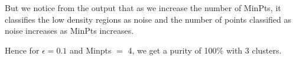 \documentclass[paper=a4, fontsize=11pt]{scrartcl}
\numberwithin{equation}{section}		%
\numberwithin{figure}{section}			%
\numberwithin{table}{section}				%
\begin{document}
But we notice from the output that as we increase the number of MinPts, it classifies the low density regions as noise and the number of points classified as noise increases as MinPts increases. 

\graphicspath{ {../Dataset/1_Clustering/Visualisations/} }
\begin{figure}[H]
  \centering
  \hfill
  \vfill
  \hfill
\end{figure}

Hence for $\epsilon = 0.1$ and  Minpts $=$ 4, we get a purity of 100$\%$ with 3 clusters.\\
\end{document}
